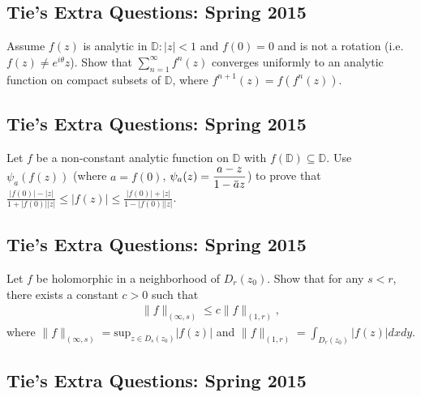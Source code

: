 \hypertarget{ties-extra-questions-spring-2015-15}{%
\subsection{Tie's Extra Questions: Spring
2015}\label{ties-extra-questions-spring-2015-15}}

Assume \(f(z)\) is analytic in \({\mathbb D}: |z|<1\) and \(f(0)=0\) and
is not a rotation (i.e.~\(f(z) \neq e^{i \theta} z\)). Show that
\(\displaystyle \sum_{n=1}^\infty f^{n}(z)\) converges uniformly to an
analytic function on compact subsets of \({\mathbb D}\), where
\(f^{n+1}(z) = f(f^{n}(z))\).

\hypertarget{ties-extra-questions-spring-2015-16}{%
\subsection{Tie's Extra Questions: Spring
2015}\label{ties-extra-questions-spring-2015-16}}

Let \(f\) be a non-constant analytic function on \(\mathbb D\) with
\(f(\mathbb D) \subseteq \mathbb D\). Use \(\psi_{a} (f(z))\) (where
\(a=f(0)\),
\(\displaystyle \psi_a(z) = \frac{a - z}{1 - \mkern 1.5mu\overline{\mkern-1.5mua\mkern-1.5mu}\mkern 1.5muz}\))
to prove that
\(\displaystyle \frac{|f(0)| - |z|}{1 + |f(0)||z|} \leq |f(z)| \leq \frac{|f(0)| + |z|}{1 - |f(0)||z|}\).

\hypertarget{ties-extra-questions-spring-2015-17}{%
\subsection{Tie's Extra Questions: Spring
2015}\label{ties-extra-questions-spring-2015-17}}

Let \(f\) be holomorphic in a neighborhood of \(D_r(z_0)\). Show that
for any \(s<r\), there exists a constant \(c>0\) such that
\begin{align*}
\|f\|_{(\infty, s)} \leq c \|f\|_{(1, r)}
,\end{align*}
where
\(\displaystyle \|f\|_{(\infty, s)} = \text{sup}_{z \in D_s(z_0)}|f(z)|\)
and \(\displaystyle \|f\|_{(1, r)} = \int_{D_r(z_0)} |f(z)|dx dy\).

\hypertarget{ties-extra-questions-spring-2015-18}{%
\subsection{Tie's Extra Questions: Spring
2015}\label{ties-extra-questions-spring-2015-18}}

